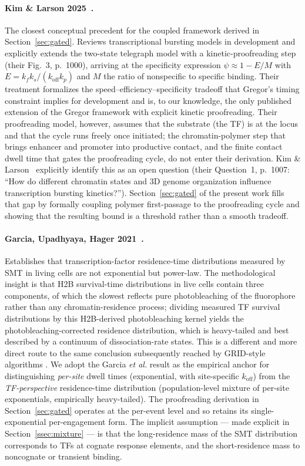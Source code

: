 \documentclass[11pt]{article}
\begin{document}
\paragraph{Kim \& Larson 2025~\cite{KimLarson2025}.} The closest
conceptual precedent for the coupled framework derived in
Section~\ref{sec:gated}. Reviews transcriptional bursting models in
development and explicitly extends the two-state telegraph model with a
kinetic-proofreading step (their Fig.~3, p.~1000), arriving at the
specificity expression
$\psi \approx 1 - E/M$ with $E = k_f k_s/(k_{\mathrm{off}}k_p)$ and $M$ the
ratio of nonspecific to specific binding. Their treatment formalizes the
speed--efficiency--specificity tradeoff that Gregor's timing constraint
implies for development and is, to our knowledge, the only published
extension of the Gregor framework with explicit kinetic proofreading.
Their proofreading model, however, assumes that the substrate (the TF)
is at the locus and that the cycle runs freely once initiated; the
chromatin-polymer step that brings enhancer and promoter into productive
contact, and the finite contact dwell time that gates the proofreading
cycle, do not enter their derivation. Kim \& Larson~\cite{KimLarson2025}
explicitly identify this as an open question (their Question~1, p.~1007:
``How do different chromatin states and 3D genome organization influence
transcription bursting kinetics?''). Section~\ref{sec:gated} of the
present work fills that gap by formally coupling polymer first-passage
to the proofreading cycle and showing that the resulting bound is a
threshold rather than a smooth tradeoff.

\paragraph{Garcia, Upadhyaya, Hager 2021~\cite{Garcia2021NAR}.}
Establishes that transcription-factor residence-time distributions
measured by SMT in living cells are not exponential but power-law. The
methodological insight is that H2B survival-time distributions in live
cells contain three components, of which the slowest reflects pure
photobleaching of the fluorophore rather than any chromatin-residence
process; dividing measured TF survival distributions by this H2B-derived
photobleaching kernel yields the photobleaching-corrected residence
distribution, which is heavy-tailed and best described by a continuum of
dissociation-rate states. This is a different and more direct route to
the same conclusion subsequently reached by GRID-style algorithms
\cite{Popp2021}. We adopt the Garcia \textit{et al.} result as the
empirical anchor for distinguishing
\emph{per-site} dwell times (exponential, with site-specific
$k_{\mathrm{off}}$) from the \emph{TF-perspective} residence-time
distribution (population-level mixture of per-site exponentials,
empirically heavy-tailed). The proofreading derivation in
Section~\ref{sec:gated} operates at the per-event level and so retains
its single-exponential per-engagement form. The implicit assumption ---
made explicit in Section~\ref{ssec:mixture} --- is that the long-residence
mass of the SMT distribution corresponds to TFs at cognate response
elements, and the short-residence mass to noncognate or transient
binding.
\end{document}

